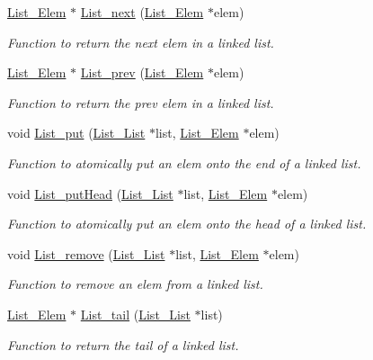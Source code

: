 \begin{DoxyCompactItemize}
\hyperlink{struct_list___elem}{List\+\_\+\+Elem} $\ast$ \hyperlink{_list_8h_aba651a8cc8901027dc073765e492c3b2}{List\+\_\+next} (\hyperlink{struct_list___elem}{List\+\_\+\+Elem} $\ast$elem)
\begin{DoxyCompactList}\small\item\em Function to return the next elem in a linked list. \end{DoxyCompactList}\item 
\hyperlink{struct_list___elem}{List\+\_\+\+Elem} $\ast$ \hyperlink{_list_8h_a83b885311205f2facb1284bfc348fb27}{List\+\_\+prev} (\hyperlink{struct_list___elem}{List\+\_\+\+Elem} $\ast$elem)
\begin{DoxyCompactList}\small\item\em Function to return the prev elem in a linked list. \end{DoxyCompactList}\item 
void \hyperlink{_list_8h_a1608b5d7dc712fcf01dc5d837e22078a}{List\+\_\+put} (\hyperlink{struct_list___list}{List\+\_\+\+List} $\ast$list, \hyperlink{struct_list___elem}{List\+\_\+\+Elem} $\ast$elem)
\begin{DoxyCompactList}\small\item\em Function to atomically put an elem onto the end of a linked list. \end{DoxyCompactList}\item 
void \hyperlink{_list_8h_a1194d8eead79730c5da10e36b60f7044}{List\+\_\+put\+Head} (\hyperlink{struct_list___list}{List\+\_\+\+List} $\ast$list, \hyperlink{struct_list___elem}{List\+\_\+\+Elem} $\ast$elem)
\begin{DoxyCompactList}\small\item\em Function to atomically put an elem onto the head of a linked list. \end{DoxyCompactList}\item 
void \hyperlink{_list_8h_a480146af207e00199372c66edb4d9960}{List\+\_\+remove} (\hyperlink{struct_list___list}{List\+\_\+\+List} $\ast$list, \hyperlink{struct_list___elem}{List\+\_\+\+Elem} $\ast$elem)
\begin{DoxyCompactList}\small\item\em Function to remove an elem from a linked list. \end{DoxyCompactList}\item 
\hyperlink{struct_list___elem}{List\+\_\+\+Elem} $\ast$ \hyperlink{_list_8h_afead3df16679335957a5bf4437866212}{List\+\_\+tail} (\hyperlink{struct_list___list}{List\+\_\+\+List} $\ast$list)
\begin{DoxyCompactList}\small\item\em Function to return the tail of a linked list. \end{DoxyCompactList}\end{DoxyCompactItemize}


